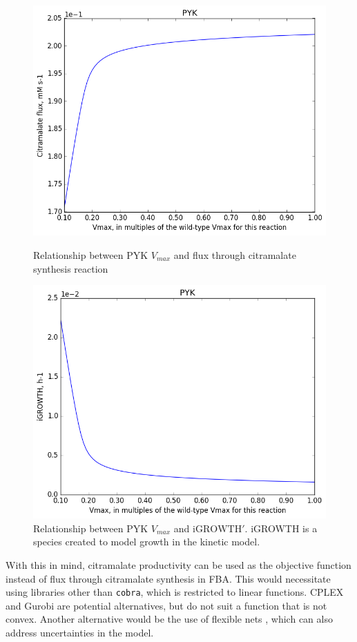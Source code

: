 \documentclass[parskip=full, numbers=noenddot]{scrreprt}
\begin{document}
\begin{figure}[!htbp]
  \centering
  \includegraphics[scale=0.4]{issues_citraflux}
  \caption{Relationship between PYK $V_{max}$ and flux through citramalate synthesis reaction}
  \label{fig:issues_citraflux}

  \centering
  \includegraphics[scale=0.4]{issues_igrowth}
  \caption{Relationship between PYK $V_{max}$ and $\mathrm{iGROWTH}'$. iGROWTH is a species created to model growth in the kinetic model.}
  \label{fig:issues_igrowth}
\end{figure}

With this in mind, citramalate productivity can be used as the objective function instead of flux through citramalate synthesis in FBA. This would necessitate using libraries other than \texttt{cobra}, which is restricted to linear functions. CPLEX and Gurobi are potential alternatives, but do not suit a function that is not convex. Another alternative would be the use of flexible nets \citep{julvez_handling_2018}, which can also address uncertainties in the model.
\end{document}
